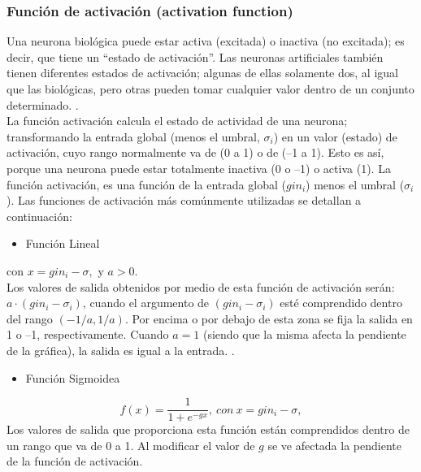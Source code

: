 \subsubsection{Función de activación (activation function)}
Una neurona biológica puede estar activa (excitada) o inactiva (no excitada); es decir, que tiene un “estado de activación”. Las neuronas artificiales también tienen diferentes estados de activación; algunas de ellas solamente dos, al igual que las biológicas, pero otras pueden tomar cualquier valor dentro de un conjunto determinado. \citep{matich2001redes}.\\
La función activación calcula el estado de actividad de una neurona; transformando la entrada global (menos el umbral, $\sigma_{i}$) en un valor (estado) de activación, cuyo rango normalmente va de (0 a 1) o de (–1 a 1). Esto es así, porque una neurona puede estar totalmente inactiva (0 o –1) o activa (1).
La función activación, es una función de la entrada global ($gin_{i}$) menos el umbral ($\sigma_{i}$). Las funciones de activación más comúnmente utilizadas se detallan a continuación:

\begin{itemize}
\item Función Lineal
\end{itemize}

con $x=gin_{i} -	\sigma, $ y $a >0.$\\
Los valores de salida obtenidos por medio de esta función de activación serán: $a\cdot(gin_{i} - \sigma_{i})$, cuando el argumento de $(gin_{i} - \sigma_{i})$ esté comprendido dentro del rango $(-1/a, 1/a)$. Por encima o por debajo de esta zona se fija la salida en 1 o –1, respectivamente.
Cuando $a = 1$ (siendo que la misma afecta la pendiente de la gráfica), la salida es igual a la entrada. \citep{matich2001redes}.

\begin{itemize}
    \item Función Sigmoidea
\end{itemize}

\begin{equation}
f(x)= \frac{1}{1+e^{-gx}}, \ con \ x=gin_{i}-\sigma,
\label{funcionSigmoidea}
\end{equation}
Los valores de salida que proporciona esta función están comprendidos dentro de un rango que va de 0 a 1. Al
modificar el valor de $g$ se ve afectada la pendiente de la función de activación. 

